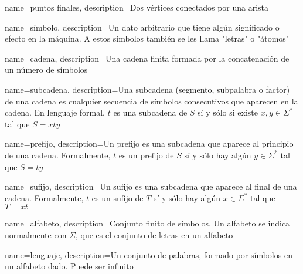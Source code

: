 

{
	name=puntos finales,
	description={Dos vértices conectados por una arista}
}

{
	name=símbolo,
	description={Un dato arbitrario que tiene algún significado o efecto en la máquina. A estos símbolos también se les llama "letras" o "átomos"}
}

{
	name=cadena,
	description={Una cadena finita formada por la concatenación de un número de símbolos}
}

{
	name=subcadena,
	description={Una subcadena (segmento, subpalabra o factor) de una cadena es cualquier secuencia de símbolos consecutivos que aparecen en la cadena. En lenguaje formal, $t$ es una subcadena de $S$ sí y sólo si existe $x, y \in \Sigma^\ast$ tal que $S = xty$
	}
}

{
	name=prefijo,
	description={Un prefijo es una subcadena que aparece al principio de una cadena. Formalmente, $t$ es un prefijo de $S$ sí y sólo hay algún $y \in \Sigma^\ast$ tal que $S = ty$}
}

{
	name=sufijo,
	description={Un sufijo es una subcadena que aparece al final de una cadena. Formalmente, $t$ es un sufijo de $T$ sí y sólo hay algún $x \in \Sigma^\ast$ tal que $T = xt$}
}


{
	name=alfabeto,
	description={Conjunto finito de símbolos. Un alfabeto se indica normalmente con $\Sigma$, que es el conjunto de letras en un alfabeto}
}

{
	name=lenguaje,
	description={Un conjunto de palabras, formado por símbolos en un alfabeto dado. Puede ser infinito}
}

